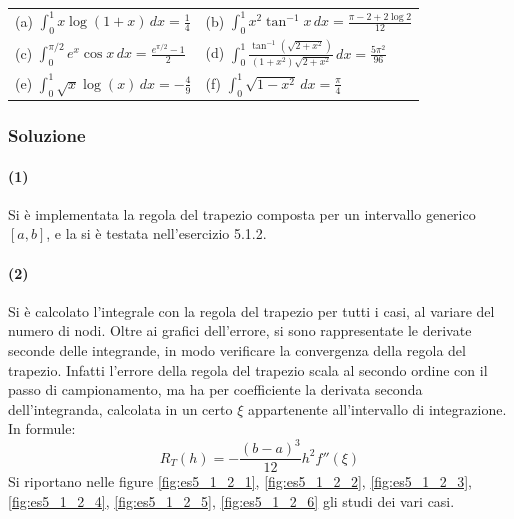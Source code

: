 \documentclass[letterpaper, 12pt]{article}
\numberwithin{equation}{section}    %
\begin{document}
\begin{tabular}{@{}ll@{}}
(a) $\displaystyle \int_0^1 x\log(1+x)\, dx = \frac{1}{4}$
    & (b) $\displaystyle \int_0^1 x^2 \tan^{-1}x\, dx = \frac{\pi-2+2\log 2}{12}$ \\[1.5ex]
(c) $\displaystyle \int_0^{\pi/2}e^x \cos x\, dx = \frac{e^{\pi/2}-1}{2}$
    & (d) $\displaystyle \int_0^1 \frac{\tan^{-1}(\sqrt{2+x^2})}{(1+x^2)\sqrt{2+x^2}}\,dx = \frac{5\pi^2}{96}$ \\[1.5ex]
(e) $\displaystyle \int_0^1 \sqrt{x} \log(x) \, dx = -\frac{4}{9}$ 
    & (f) $\displaystyle \int_0^1 \sqrt{1-x^2}\, dx = \frac{\pi}{4}$ \\ [1.5ex]
\end{tabular}

\subsubsection{Soluzione}
\paragraph{(1)}Si è implementata la regola del trapezio composta per un intervallo generico $[a,b]$,
e la si è testata nell'esercizio 5.1.2.
\paragraph{(2)}Si è calcolato l'integrale con la regola del trapezio per tutti i casi, al variare del numero di
nodi. Oltre ai grafici dell'errore, si sono rappresentate le derivate seconde delle integrande,
in modo verificare la convergenza della regola del trapezio. Infatti l'errore della regola del trapezio 
scala al secondo ordine con il passo di campionamento,
ma ha per coefficiente la derivata seconda dell'integranda, calcolata in un certo $\xi$ appartenente all'intervallo
di integrazione. In formule:
\[
R_T(h) = -\frac{(b-a)^3 }{12}h^2 f''(\xi)
\]
Si riportano nelle figure \ref{fig:es5_1_2_1}, \ref{fig:es5_1_2_2}, \ref{fig:es5_1_2_3}, 
\ref{fig:es5_1_2_4}, \ref{fig:es5_1_2_5}, \ref{fig:es5_1_2_6} gli studi dei vari casi.
\end{document}

